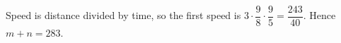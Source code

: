 Speed is distance divided by time, so the first speed is $3\cdot\dfrac{9}{8}\cdot\dfrac{9}{5}=\dfrac{243}{40}$. Hence $\boxed{m+n=283}$.
